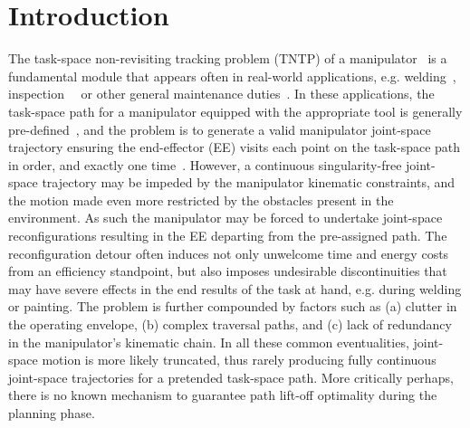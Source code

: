 \documentclass[letterpaper, 10 pt, conference]{ieeeconf}  %
\begin{document}
\section{Introduction}
The task-space non-revisiting tracking problem (TNTP) of a manipulator~\cite{Liang2010Adaptive} is a fundamental module that appears often in real-world applications, e.g.  welding~\cite{Norberto2003Welding}, inspection~\cite{Nakhaeinia2013Trajectory}~\cite{Simetti2016Underwater} or other general maintenance duties~\cite{Simetti2016Underwater}. 
In these applications, the task-space path for a manipulator equipped with the appropriate tool is generally pre-defined~\cite{Chen2019Synchronization}, and the problem is to generate a valid manipulator joint-space trajectory ensuring the end-effector (EE)  visits each point on the task-space path in order, and exactly one time~\cite{Janiak2017Motion}. 
However, a continuous singularity-free joint-space trajectory may be impeded by the manipulator kinematic constraints, and the motion made even more restricted by the obstacles present in the environment. As such the manipulator may be forced to undertake joint-space reconfigurations resulting in the EE departing from the pre-assigned path. 
The reconfiguration detour often induces not only unwelcome time and energy costs from an efficiency standpoint, but also imposes undesirable discontinuities that may have severe effects in the end results of the task at hand, e.g. during welding or painting.  The problem is further compounded by factors such as (a) clutter in the operating envelope, (b) complex traversal paths, and (c) lack of redundancy in the manipulator's kinematic chain. In all these common eventualities, joint-space motion is more likely truncated, thus rarely producing fully continuous joint-space trajectories for a pretended task-space path. More critically perhaps, there is no known mechanism to guarantee path lift-off optimality during the planning phase. 
\end{document}
